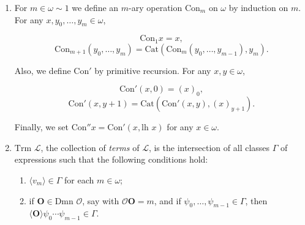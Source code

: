 \begin{enumerate}
\item[(i)] For $m \in \omega \sim 1$ we define an $m$-ary operation $\text{Con}_m$ on $\omega$ by induction on $m$. For any $x, y_0, \ldots, y_m \in \omega$,

$$\text{Con}_1 x = x,$$
$$\text{Con}_{m+1} (y_0, \ldots, y_m) = \text{Cat} (\text{Con}_m (y_0, \ldots, y_{m-1}), y_m).$$

Also, we define $\text{Con}'$ by primitive recursion. For any $x, y \in \omega$,

$$\text{Con}' (x, 0) = (x)_0,$$
$$\text{Con}' (x, y+1) = \text{Cat} (\text{Con}' (x, y), (x)_{y+1}).$$

Finally, we set $\text{Con}'' x = \text{Con}' (x, \text{lh } x)$ for any $x \in \omega$.

\item[(ii)] $\text{Trm } \mathcal{L}$, the collection of \textit{terms} of $\mathcal{L}$, is the intersection of all classes $\Gamma$ of expressions such that the following conditions hold:

\begin{enumerate}
\item[(1)] $\langle v_m \rangle \in \Gamma$ for each $m \in \omega$;
\item[(2)] if $\mathbf{O} \in \text{Dmn } \mathcal{O}$, say with $\mathcal{O}\mathbf{O} = m$, and if $\psi_0, \ldots, \psi_{m-1} \in \Gamma$, then $\langle \mathbf{O} \rangle \psi_0 \cdots \psi_{m-1} \in \Gamma$.
\end{enumerate}
\end{enumerate}
